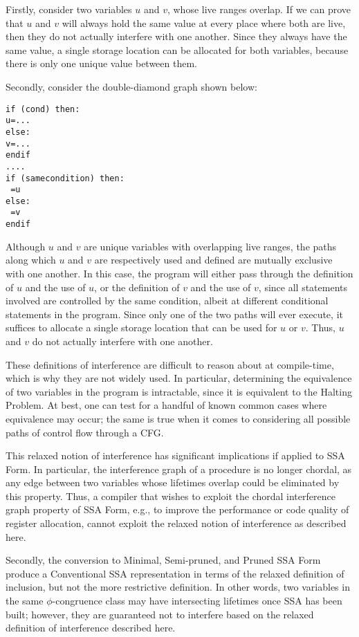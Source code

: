 Firstly, consider two variables $u$ and $v$, whose live ranges overlap.
If we can prove that $u$ and $v$ will always hold the same value
at every place where both are live, then they do not actually interfere
with one another. Since they always have the same value, a single 
storage location can be allocated for both variables, because there
is only one unique value between them.

Secondly, consider the double-diamond graph shown below:

\begin{verbatim}
if (cond) then:
u=...
else:
v=...
endif
....
if (samecondition) then:
 =u
else:
 =v
endif
\end{verbatim}

Although $u$ and $v$ are unique variables with overlapping live
ranges, the paths along which $u$ and $v$ are respectively used and
defined are mutually exclusive with one another. In this case, the
program will either pass through the definition of $u$ and the use
of $u$, or the definition of $v$ and the use of $v$, since all
statements involved are controlled by the same condition, albeit
at different conditional statements in the program. Since only
one of the two paths will ever execute, it suffices to allocate a 
single storage location that can be used for $u$ or $v$. Thus, $u$
and $v$ do not actually interfere with one another. 
 
These definitions of interference are difficult to reason about at 
compile-time, which is why they are not widely used. In particular,
determining the equivalence of two variables in the program is
intractable, since it is equivalent to the Halting Problem. At best,
one can test for a handful of known common cases where 
equivalence may occur; the same is true when it comes to considering
all possible paths of control flow through a CFG. 

This relaxed notion of interference has significant implications if
applied to SSA Form. In particular, the interference graph of a procedure
is no longer chordal, as any edge between two variables whose lifetimes
overlap could be eliminated by this property. Thus, a compiler that
wishes to exploit the chordal interference graph property of SSA Form, 
e.g., to improve the performance or code quality of register allocation,
cannot exploit the relaxed notion of interference as described here.

Secondly, the conversion to Minimal, Semi-pruned, and Pruned SSA Form
produce a Conventional SSA representation in terms of the relaxed 
definition of inclusion, but not the more restrictive definition. In other
words, two variables in the same $\phi$-congruence class may have 
intersecting lifetimes once SSA has been built; however, they are
guaranteed not to interfere based on the relaxed definition
of interference described here. 





